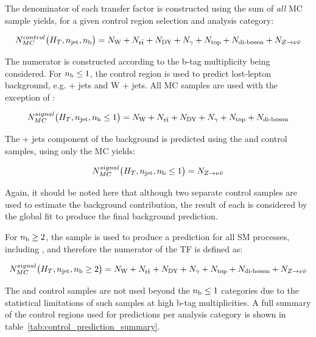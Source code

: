 The denominator of each transfer factor is constructed using the sum of
\textit{all} MC sample yields, for a given control region selection and
analysis category:

\begin{equation}
N_{MC}^{control}\big(H_T, n_{\text{jet}}, n_{\text{b}}\big) = N_{\text{W}} + N_{\text{t}\bar{\text{t}}} + N_{\text{DY}} + N_{\gamma} + 
N_{\text{top}} + N_{\text{di-boson}} + N_{Z \to \nu\bar{\nu}}
\label{eq:trans_fact_denom}
\end{equation}

The numerator is constructed according to the b-tag multiplicity being 
considered. For $n_{\text{b}} \leq 1$, the \mj control region is used to predict 
lost-lepton background, e.g. \ttbar + jets and W + jets. All MC samples
are used with the exception of \zinv:

\begin{equation}
N_{MC}^{signal}\big(H_T, n_{\text{jet}}, n_{\text{b}} \leq 1\big) = N_{\text{W}} + N_{\text{t}\bar{\text{t}}} + N_{\text{DY}} + N_{\gamma} + 
N_{\text{top}} + N_{\text{di-boson}}
\label{eq:trans_fact_num_le1b_noz}
\end{equation}

The \zinv + jets component of the background is predicted using the \mmj
and \gj control samples, using only the \zinv MC yields:

\begin{equation}
N_{MC}^{signal}\big(H_T, n_{\text{jet}}, n_{\text{b}} \leq 1 \big) = N_{Z \to \nu\bar{\nu}}
\label{eq:trans_fact_num_le1b_z}
\end{equation}

Again, it should be noted here that although two separate control samples are 
used to estimate the \zinv background contribution, the result of each is
considered by the global fit to produce the final background prediction.

For $n_{\text{b}} \geq 2$, the \mj sample is used to produce a prediction for all 
SM processes, including \zinv, and therefore the numerator of the TF is defined as:

\begin{equation}
N_{MC}^{signal}\big(H_T, n_{\text{jet}}, n_{\text{b}} \geq 2 \big) = N_{\text{W}} + N_{\text{t}\bar{\text{t}}} + N_{\text{DY}} + N_{\gamma} + 
N_{\text{top}} + N_{\text{di-boson}} + N_{Z \to \nu\bar{\nu}}
\label{eq:trans_fact_num_geq2b}
\end{equation}

The \mmj and \gj control samples are not used beyond the $n_{\text{b}} \leq 1$ categories
due to the statistical limitations of such samples at high b-tag multiplicities.
A full summary of the control regions used for predictions per analysis category
is shown in table~\ref{tab:control_prediction_summary}.

